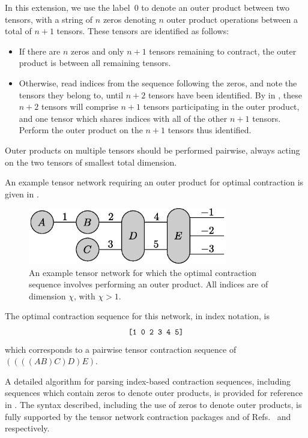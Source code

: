 In this extension, we use the label~0 to denote an outer product between two tensors, with a string of $n$ zeros denoting $n$ outer product operations between a total of $n+1$ tensors. These tensors are identified as follows:
\begin{itemize}
\item If there are $n$ zeros and only $n+1$ tensors remaining to contract, the outer product is between all remaining tensors.
\item Otherwise, read indices from the sequence following the zeros, and note the tensors they belong to, until $n+2$ tensors have been identified. By  in , these $n+2$ tensors will comprise $n+1$ tensors participating in the outer product, and one tensor which shares indices with all of the other $n+1$ tensors. Perform the outer product on the $n+1$ tensors thus identified.
\end{itemize}
Outer products on multiple tensors should be performed pairwise, always acting on the two tensors of smallest total dimension.

An example tensor network requiring an outer product for optimal contraction is given in .
\begin{figure}
\includegraphics[width=246.0pt]{disjointsequence}
\caption{An example tensor network for which the optimal contraction sequence involves performing an outer product. All indices are of dimension $\chi$, with $\chi>1$.\label{fig:disjointsequence}}
\end{figure}%
The optimal contraction sequence for this network, in index notation, is
\begin{equation*}
\texttt{[1 0 2 3 4 5]}
\end{equation*}
which corresponds to a pairwise tensor contraction sequence of
$((((AB)C)D)E)$.

A detailed algorithm for parsing index-based contraction sequences, including sequences which contain zeros to denote outer products, is provided for reference in . The syntax described, including the use of zeros to denote outer products, is fully supported by the tensor network contraction packages  and  of Refs.~ and~ respectively.

